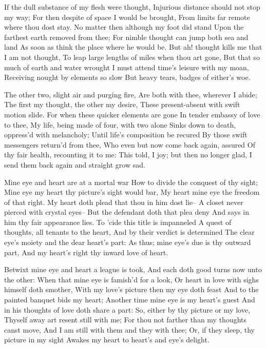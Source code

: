 \documentclass[twocolumn]{book}
\begin{document}
If the dull substance of my flesh were thought,
Injurious distance should not stop my way;
For then despite of space I would be brought,
From limits far remote where thou dost stay.
\numerus*{}No matter then although my foot did stand
Upon the farthest earth removed from thee;
For nimble thought can jump both sea and land
As soon as think the place where he would be.
But ah! thought kills me that I am not thought,
To leap large lengths of miles when thou art gone,
But that so much of earth and water wrought
I must attend time's leisure with my moan,
  Receiving nought by elements so slow
  But heavy tears, badges of either's woe.


The other two, slight air and purging fire,
Are both with thee, wherever I abide;
The first my thought, the other my desire,
These present-absent with swift motion slide.
For when these quicker elements are gone
In tender embassy of love to thee,
My life, being made of four, with two alone
Sinks down to death, oppress'd with melancholy;
Until life's composition be recured
By those swift messengers return'd from thee,
Who even but now come back again, assured
Of thy fair health, recounting it to me:
  This told, I joy; but then no longer glad,
  I send them back again and straight grow sad.


Mine eye and heart are at a mortal war
How to divide the conquest of thy sight;
Mine eye my heart thy picture's sight would bar,
My heart mine eye the freedom of that right.
My heart doth plead that thou in him dost lie--
A closet never pierced with crystal eyes--
But the defendant doth that plea deny
And says in him thy fair appearance lies.
To 'cide this title is impanneled
A quest of thoughts, all tenants to the heart,
And by their verdict is determined
The clear eye's moiety and the dear heart's part:
  As thus; mine eye's due is thy outward part,
  And my heart's right thy inward love of heart.


Betwixt mine eye and heart a league is took,
And each doth good turns now unto the other:
When that mine eye is famish'd for a look,
Or heart in love with sighs himself doth smother,
With my love's picture then my eye doth feast
And to the painted banquet bids my heart;
Another time mine eye is my heart's guest
And in his thoughts of love doth share a part:
So, either by thy picture or my love,
Thyself away art resent still with me;
For thou not farther than my thoughts canst move,
And I am still with them and they with thee;
  Or, if they sleep, thy picture in my sight
  Awakes my heart to heart's and eye's delight.
\end{document}
